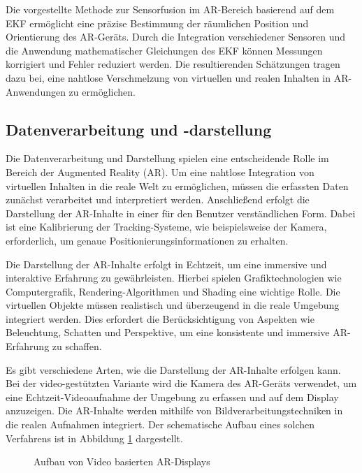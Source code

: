 Die vorgestellte Methode zur Sensorfusion im AR-Bereich basierend auf dem EKF
ermöglicht eine präzise Bestimmung der räumlichen Position und Orientierung des
AR-Geräts. Durch die Integration verschiedener Sensoren und die Anwendung
mathematischer Gleichungen des EKF können Messungen korrigiert und Fehler
reduziert werden. Die resultierenden Schätzungen tragen dazu bei, eine nahtlose
Verschmelzung von virtuellen und realen Inhalten in AR-Anwendungen zu
ermöglichen.

\subsection{Datenverarbeitung und -darstellung}
Die Datenverarbeitung und Darstellung spielen eine entscheidende Rolle im
Bereich der Augmented Reality (AR). Um eine nahtlose Integration von virtuellen
Inhalten in die reale Welt zu ermöglichen, müssen die erfassten Daten zunächst
verarbeitet und interpretiert werden. Anschließend erfolgt die Darstellung der
AR-Inhalte in einer für den Benutzer verständlichen Form. Dabei ist eine
Kalibrierung der Tracking-Systeme, wie beispielsweise der Kamera, erforderlich,
um genaue Positionierungsinformationen zu erhalten.

Die Darstellung der AR-Inhalte erfolgt in Echtzeit, um eine immersive und
interaktive Erfahrung zu gewährleisten. Hierbei spielen Grafiktechnologien wie
Computergrafik, Rendering-Algorithmen und Shading eine wichtige Rolle. Die
virtuellen Objekte müssen realistisch und überzeugend in die reale Umgebung
integriert werden. Dies erfordert die Berücksichtigung von Aspekten wie
Beleuchtung, Schatten und Perspektive, um eine konsistente und immersive
AR-Erfahrung zu schaffen.

Es gibt verschiedene Arten, wie die Darstellung der AR-Inhalte erfolgen kann.
Bei der video-gestützten Variante wird die Kamera des AR-Geräts verwendet, um
eine Echtzeit-Videoaufnahme der Umgebung zu erfassen und auf dem Display
anzuzeigen. Die AR-Inhalte werden mithilfe von Bildverarbeitungstechniken in
die realen Aufnahmen integriert. Der schematische Aufbau eines solchen
Verfahrens ist in Abbildung \ref{fig:VBAR} dargestellt.

\begin{figure}[h]
      \centering
      
      \caption[width=0.7\columnwidth]{Aufbau von Video basierten AR-Displays \cite{billinghurst2015survey}}
      \label{fig:VBAR}
\end{figure}

